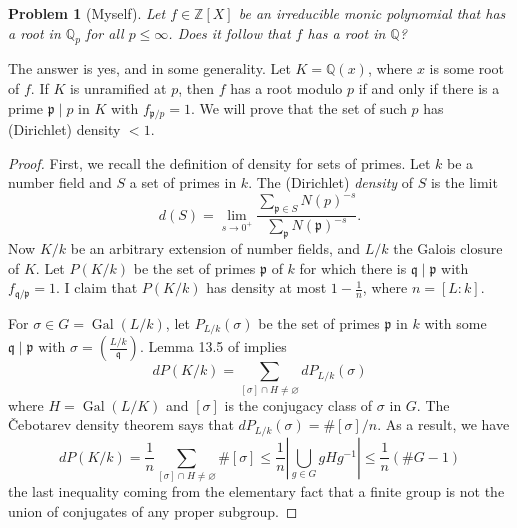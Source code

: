 \documentclass{article}
\newtheorem{problem}{Problem}
\DeclareMathOperator{\gal}{Gal}
\newcommand{\dQ}{\mathbb{Q}}
\newcommand{\dZ}{\mathbb{Z}}
\newcommand{\fp}{\mathfrak{p}}
\newcommand{\fq}{\mathfrak{q}}
\begin{document}
\begin{problem}[Myself]
Let $f\in\dZ[X]$ be an irreducible monic polynomial that has a root in $\dQ_p$ 
for all $p\leqslant \infty$. Does it follow that $f$ has a root in $\dQ$?
\end{problem}
The answer is yes, and in some generality. Let $K=\dQ(x)$, where $x$ is some 
root of $f$. If $K$ is unramified at $p$, then $f$ has a root modulo $p$ if and 
only if there is a prime $\fp\mid p$ in $K$ with $f_{\fp/p} = 1$. We will 
prove that the set of such $p$ has (Dirichlet) density $<1$. 
\begin{proof}
First, we recall the definition of density for sets of primes. Let $k$ 
be a number field and $S$ a set of  primes in $k$. The (Dirichlet) 
\emph{density} of $S$ is the limit 
\[
  d(S) = \lim_{s\to 0^+} \frac{\sum_{\fp\in S} N(p)^{-s}}{\sum_\fp N(\fp)^{-s}} \text{.}
\]
Now $K/k$ be an arbitrary extension of number fields, and $L/k$ the Galois 
closure of $K$. Let $P(K/k)$ be the set of primes $\fp$ of $k$ for which there 
is $\fq\mid \fp$ with $f_{\fq/\fp}=1$. I claim that $P(K/k)$ has density at 
most $1-\frac 1 n$, where $n=[L:k]$. 

For $\sigma\in G=\gal(L/k)$, let $P_{L/k}(\sigma)$ be the set of primes $\fp$ 
in $k$ with some $\fq\mid \fp$ with $\sigma = \left(\frac{L/k}{\fq}\right)$. 
Lemma 13.5 of \cite{Neu} implies 
\[
  d P(K/k) = \sum_{[\sigma]\cap H\ne\varnothing}d P_{L/k}(\sigma)
\]
where $H=\gal(L/K)$ and $[\sigma]$ is the conjugacy class of $\sigma$ in 
$G$. The \v Cebotarev density theorem \cite[VII.13.4]{Neu} says that 
$d P_{L/k}(\sigma) = \# [\sigma] / n$. As a result, we have 
\[
  d P(K/k) = \frac 1 n \sum_{[\sigma]\cap H\ne\varnothing} \# [\sigma] 
   \leqslant \frac 1 n \left|\bigcup_{g\in G} g H g^{-1}\right|
   \leqslant \frac 1 n (\# G-1)
\]
the last inequality coming from the elementary fact that a finite group is not 
the union of conjugates of any proper subgroup. 
\end{proof}
\end{document}
